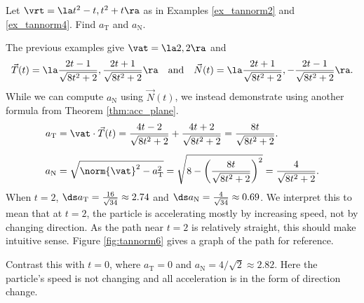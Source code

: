 {Let $\vrt=\la t^2-t,t^2+t\ra$ as in Examples \ref{ex_tannorm2} and \ref{ex_tannorm4}. Find $a_\text{T}$ and $a_\text{N}$.}
{The previous examples give $\vat = \la 2,2\ra$ and
\[
\vec T(t) = \la \frac{2t-1}{\sqrt{8t^2+2}},\frac{2t+1}{\sqrt{8t^2+2}}\ra \quad \text{and}\quad \vec N(t) = \la \frac{2t+1}{\sqrt{8t^2+2}},-\frac{2t-1}{\sqrt{8t^2+2}}\ra.
\]
While we can compute $a_\text{N}$ using $\vec N(t)$, we instead demonstrate using another formula from Theorem \ref{thm:acc_plane}.
\begin{align*}
a_\text{T} &= \vat\cdot\vec T(t) = \frac{4t-2}{\sqrt{8t^2+2}}+\frac{4t+2}{\sqrt{8t^2+2}} = \frac{8t}{\sqrt{8t^2+2}}.\\
a_\text{N} &= \sqrt{\norm{\vat}^2-a_\text{T}^2} = \sqrt{8-\left(\frac{8t}{\sqrt{8t^2+2}}\right)^2}=\frac{4}{\sqrt{8t^2+2}}\rule{0pt}{25pt}.
\end{align*}
When $t=2$, $\ds a_\text{T} = \frac{16}{\sqrt{34}}\approx 2.74$ and $\ds a_\text{N} = \frac{4}{\sqrt{34}} \approx 0.69$. We interpret this to mean that at $t=2$, the particle is accelerating mostly by increasing speed, not by changing direction. As the path near $t=2$ is relatively straight, this should make intuitive sense. Figure \ref{fig:tannorm6} gives a graph of the path for reference.

Contrast this with $t=0$, where $a_\text{T} = 0$ and $a_\text{N} = 4/\sqrt{2}\approx 2.82$. Here the particle's speed is not changing and all acceleration is in the form of direction change.
}\\


